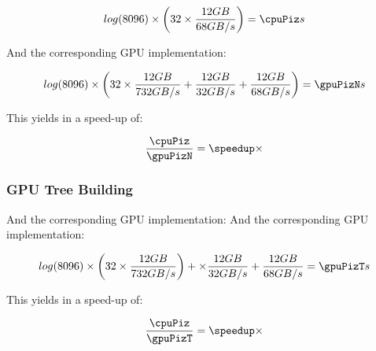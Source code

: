 \documentclass[]{article}
\begin{document}
\pgfmathsetmacro{}

\begin{center}
	\begin{equation}
		log(\d) \times \left ( \p \times \frac{ \s GB }{68 GB/s} \right )  = \cpuPiz s
	\end{equation}
\end{center}


And the corresponding GPU implementation:
\pgfmathsetmacro{}
\begin{center}
	\begin{equation}
		log(\d) \times \left ( 32 \times \frac{12 GB}{732 GB/s} + \frac{12 GB}{32 GB/s}  + \frac{12 GB}{68 GB/s} \right )=  \gpuPizN s
	\end{equation}
\end{center}

This yields in a speed-up of:
\pgfmathsetmacro\speedup{\cpuPiz / \gpuPizN}
\begin{center}
	\begin{equation}
		\frac{\cpuPiz}{\gpuPizN} = \speedup \times
	\end{equation}
\end{center}


\subsubsection{GPU Tree Building}

And the corresponding GPU implementation:
\pgfmathsetmacro{}
And the corresponding GPU implementation:
\begin{center}
	\begin{equation}
		log(\d) \times \left ( \p \times \frac{\s GB}{732 GB/s} \right ) + \times \frac{\s GB}{32 GB/s}  + \frac{\s GB}{68 GB/s} = \gpuPizT s
	\end{equation}
\end{center}

This yields in a speed-up of:
\pgfmathsetmacro\speedup{\cpuPiz / \gpuPizT}
\begin{center}
	\begin{equation}
		\frac{\cpuPiz}{\gpuPizT} = \speedup \times
	\end{equation}
\end{center}

\vspace{5mm}
\end{document}

